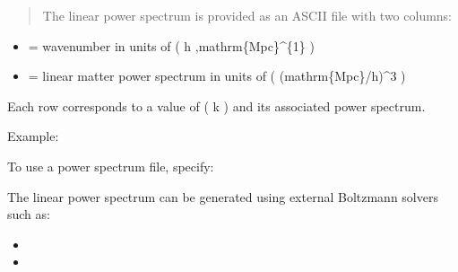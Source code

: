 \documentclass[letterpaper,10pt,english]{sphinxmanual}
\begin{document}
\sphinxAtStartPar
{}
\begin{quote}\begin{description}
\sphinxAtStartPar
The linear power spectrum is provided as an ASCII file with two columns:

\end{description}\end{quote}
\begin{itemize}
\item {} 
\sphinxAtStartPar
{} = wavenumber in units of ( h ,mathrm\{Mpc\}\textasciicircum{}\{\sphinxhyphen{}1\} )

\item {} 
\sphinxAtStartPar
{} = linear matter power spectrum in units of ( (mathrm\{Mpc\}/h)\textasciicircum{}3 )

\end{itemize}

\sphinxAtStartPar
Each row corresponds to a value of ( k ) and its associated power spectrum.

\sphinxAtStartPar
Example:

\begin{sphinxVerbatim}[commandchars=\\\{\}]
   
   
   
\end{sphinxVerbatim}

\sphinxAtStartPar
{}

\sphinxAtStartPar
To use a power spectrum file, specify:

\begin{sphinxVerbatim}[commandchars=\\\{\}]
\end{sphinxVerbatim}

\sphinxAtStartPar
The linear power spectrum can be generated using external Boltzmann solvers such as:
\begin{itemize}
\item {} 
\sphinxAtStartPar
{}

\item {} 
\sphinxAtStartPar
{}

\end{itemize}
\end{document}
